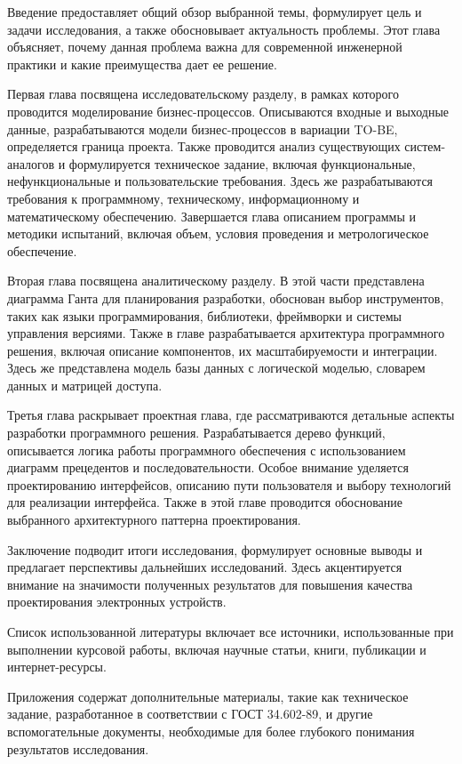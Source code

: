 Введение предоставляет общий обзор выбранной темы, формулирует цель
и задачи исследования, а также обосновывает актуальность проблемы.
Этот глава объясняет,
почему данная проблема важна для современной инженерной практики
и какие преимущества дает ее решение.

Первая глава посвящена исследовательскому разделу,
в рамках которого проводится моделирование бизнес-процессов.
Описываются входные и выходные данные,
разрабатываются модели бизнес-процессов в вариации TO-BE,
определяется граница проекта.
Также проводится анализ существующих систем-аналогов
и формулируется техническое задание, включая функциональные, нефункциональные
и пользовательские требования.
Здесь же разрабатываются требования к программному, техническому,
информационному и математическому обеспечению.
Завершается глава описанием программы и методики испытаний,
включая объем, условия проведения и метрологическое обеспечение.

Вторая глава посвящена аналитическому разделу.
В этой части представлена диаграмма Ганта для планирования разработки,
обоснован выбор инструментов, таких как языки программирования,
библиотеки, фреймворки и системы управления версиями.
Также в главе разрабатывается архитектура программного решения,
включая описание компонентов, их масштабируемости и интеграции.
Здесь же представлена модель базы данных с логической моделью,
словарем данных и матрицей доступа.

Третья глава раскрывает проектная глава,
где рассматриваются детальные аспекты разработки программного решения.
Разрабатывается дерево функций,
описывается логика работы программного обеспечения
с использованием диаграмм прецедентов и последовательности.
Особое внимание уделяется проектированию интерфейсов,
описанию пути пользователя и выбору технологий для реализации интерфейса.
Также в этой главе проводится обоснование выбранного
архитектурного паттерна проектирования.

Заключение подводит итоги исследования,
формулирует основные выводы и предлагает перспективы дальнейших исследований.
Здесь акцентируется внимание на значимости полученных результатов
для повышения качества проектирования электронных устройств.

Список использованной литературы включает все источники,
использованные при выполнении курсовой работы, включая научные статьи,
книги, публикации и интернет-ресурсы.

Приложения содержат дополнительные материалы, такие как техническое задание,
разработанное в соответствии с ГОСТ 34.602-89,
и другие вспомогательные документы,
необходимые для более глубокого понимания результатов исследования.

